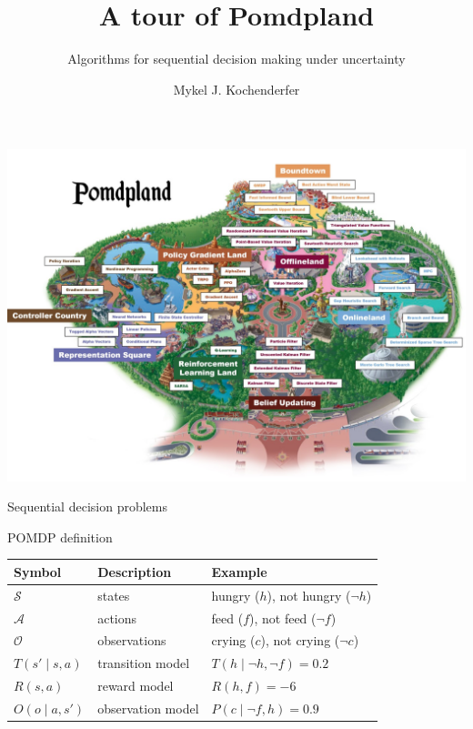 \documentclass{beamer}
\title{A tour of Pomdpland}
\subtitle{Algorithms for sequential decision making under uncertainty}
\author{Mykel J. Kochenderfer}
\institute{Stanford University}
\begin{document}
\maketitle

\begin{frame}
    \includegraphics[width=\columnwidth]{pomdpland-small.jpeg}
\end{frame}

\begin{frame}{Sequential decision problems}
\begin{center}
\end{center}    
\end{frame}

\begin{frame}{POMDP definition}
    \centering
    \begin{tabular}{@{}lll@{}} \toprule
        Symbol & Description & Example \\ \midrule
        $\mathcal S$ & states & hungry ($h$), not hungry ($\neg h$)\\
        $\mathcal A$ & actions & feed ($f$), not feed ($\neg f$)\\
        $\mathcal O$ & observations & crying ($c$), not crying ($\neg c$)\\ \midrule
        $T(s' \mid s, a)$ & transition model & $T(h \mid \neg h, \neg f) = 0.2$\\
        $R(s, a)$ & reward model & $R(h, f) = -6$ \\
        $O(o \mid a, s')$ & observation model & $P(c \mid \neg f, h) = 0.9$ \\
        \bottomrule
    \end{tabular}   
\end{frame}
\end{document}
